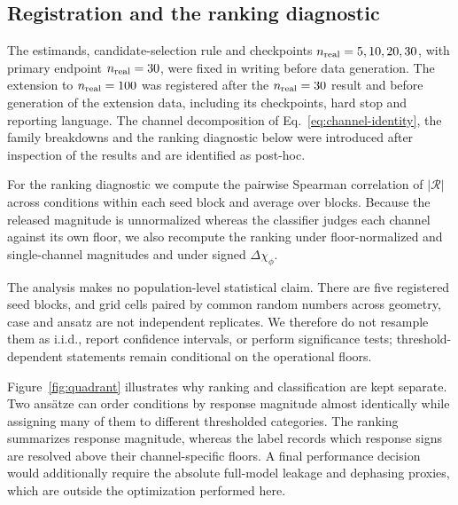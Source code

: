 \documentclass[aip,jap,reprint,superscriptaddress,longbibliography,floatfix]{revtex4-2}
\begin{document}
\subsection{Registration and the ranking diagnostic}

The estimands, candidate-selection rule and checkpoints
$n_{\rm real}=5,10,20,30$, with primary endpoint $n_{\rm real}=30$, were fixed
in writing before data generation. The extension to $n_{\rm real}=100$ was registered
after the $n_{\rm real}=30$ result and before generation of the extension
data, including its checkpoints, hard stop and reporting language. The channel
decomposition of Eq.~\eqref{eq:channel-identity}, the family breakdowns and the
ranking diagnostic below were introduced after inspection of the results and
are identified as post-hoc.

For the ranking diagnostic we compute the pairwise Spearman correlation of
$|\mathcal{R}|$ across conditions within each seed block and average over
blocks. Because the released magnitude is unnormalized whereas the classifier
judges each channel against its own floor, we also recompute the ranking under
floor-normalized and single-channel magnitudes and under signed
$\Delta\chi_\phi$.

The analysis makes no population-level statistical claim. There are five
registered seed blocks, and grid cells paired by common random numbers across
geometry, case and ansatz are not independent replicates. We therefore do not
resample them as i.i.d., report confidence intervals, or perform significance
tests; threshold-dependent statements remain conditional on the operational
floors.

Figure~\ref{fig:quadrant} illustrates why ranking and classification are kept
separate. Two ans\"atze can order conditions by response magnitude almost
identically while assigning many of them to different thresholded categories.
The ranking summarizes response magnitude, whereas the label records which
response signs are resolved above their channel-specific floors. A final
performance decision would additionally require the absolute full-model leakage
and dephasing proxies, which are outside the optimization performed here.
\end{document}
